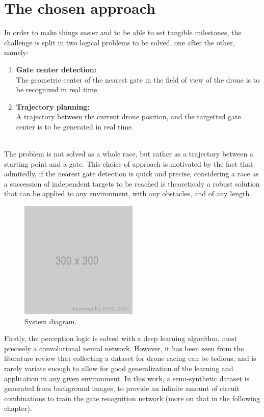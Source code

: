 \section{The chosen approach}


In order to make things easier and to be able to set tangible milestones, the
challenge is split in two logical problems to be solved, one after the
other, namely:
\begin{enumerate}
	\item{\textbf{Gate center detection:\\}
			The geometric center of the nearest gate in the field of view of the
			drone is to be recognized in real time.
	}
	\item{\textbf{Trajectory planning:\\}
			A trajectory between the current drone position, and the targetted gate
			center is to be generated in real time.
	}
\end{enumerate}

~\\The problem is not solved as a whole race, but rather as a trajectory
between a starting point and a gate. This choice of approach is motivated by
the fact that admitedly, if the nearest gate detection is quick and precise,
considering a race as a succession of independent targets to be reached is
theoreticaly a robust solution that can be applied to any environment, with any
obstacles, and of any length.\\

\begin{figure}[h]
	\centering
	\includegraphics[width=0.5\textwidth]{figure/300x300.png}
	\caption{System diagram.}
	\label{fig:system}
\end{figure}

Firstly, the perception logic is solved with a deep learning algorithm, most
precisely a convolutional neural network. However, it has been seen from
the literature review that collecting a dataset for drone racing can be
tedious, and is rarely variate enough to allow for good generalization of the
learning and application in any given environment. In this work, a
semi-synthetic dataset is generated from background images, to provide an
infinite amount of circuit combinations to train the gate recognition network
(more on that in the following chapter).

